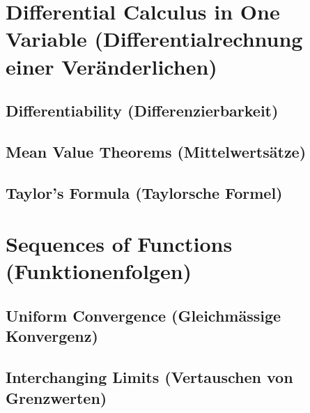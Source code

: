 \documentclass[12pt,a4paper]{article}
\theoremstyle{plain}
\theoremstyle{definition}
\theoremstyle{remark}
\begin{document}
\section{Differential Calculus in One Variable (Differentialrechnung einer Veränderlichen)}

\subsection{Differentiability (Differenzierbarkeit)}
	
\subsection{Mean Value Theorems (Mittelwertsätze)}
	
\subsection{Taylor's Formula (Taylorsche Formel)}
	
\section{Sequences of Functions (Funktionenfolgen)}

\subsection{Uniform Convergence (Gleichmässige Konvergenz)}
	
\subsection{Interchanging Limits (Vertauschen von Grenzwerten)}
	
\end{document}
